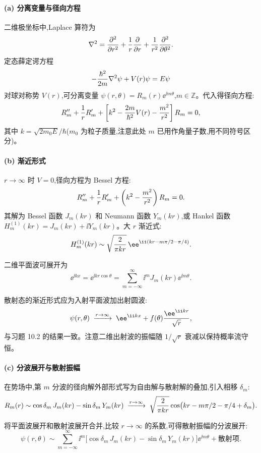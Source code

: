 \begin{solution}
\paragraph{(a) 分离变量与径向方程}

二维极坐标中,Laplace 算符为
\[
\nabla^2={\partial^2\over\partial r^2}+{1\over r}{\partial\over\partial r}+{1\over r^2}{\partial^2\over\partial\theta^2}.
\]
定态薛定谔方程
\[
-{\hbar^2\over2m}\nabla^2\psi+V(r)\psi=E\psi
\]
对球对称势 $V(r)$,可分离变量 $\psi(r,\theta)=R_m(r)\ee^{\ii m\theta}$,$m\in\mathbb Z$。代入得径向方程:
\[
R_m''+{1\over r}R_m'+\left[k^2-{2m\over\hbar^2}V(r)-{m^2\over r^2}\right]R_m=0,
\]
其中 $k=\sqrt{2m_0E}/\hbar$($m_0$ 为粒子质量,注意此处 $m$ 已用作角量子数,用不同符号区分)。

\paragraph{(b) 渐近形式}

$r\to\infty$ 时 $V=0$,径向方程为 Bessel 方程:
\[
R_m''+{1\over r}R_m'+\left(k^2-{m^2\over r^2}\right)R_m=0.
\]
其解为 Bessel 函数 $J_m(kr)$ 和 Neumann 函数 $Y_m(kr)$,或 Hankel 函数 $H_m^{(1)}(kr)=J_m(kr)+\ii Y_m(kr)$。大 $r$ 渐近式:
\[
H_m^{(1)}(kr)\sim\sqrt{2\over\pi kr}\,\ee^{\ii(kr-m\pi/2-\pi/4)}.
\]

二维平面波可展开为
\[
\ee^{\ii kx}=\ee^{\ii kr\cos\theta}=\sum_{m=-\infty}^{\infty}\ii^m J_m(kr)\ee^{\ii m\theta}.
\]

散射态的渐近形式应为入射平面波加出射圆波:
\[
\psi(r,\theta)\;\xrightarrow{r\to\infty}\; \ee^{\ii kx}+f(\theta){\ee^{\ii kr}\over\sqrt r},
\]
与习题 10.2 的结果一致。注意二维出射波的振幅随 $1/\sqrt{r}$ 衰减以保持概率流守恒。

\paragraph{(c) 分波展开与散射振幅}

在势场中,第 $m$ 分波的径向解外部形式写为自由解与散射解的叠加,引入相移 $\delta_m$:
\[
R_m(r)\sim\cos\delta_m\,J_m(kr)-\sin\delta_m\,Y_m(kr)
\;\xrightarrow{r\to\infty}\;
\sqrt{2\over\pi kr}\cos\bigl(kr-m\pi/2-\pi/4+\delta_m\bigr).
\]

将平面波展开和散射波展开合并,比较 $r\to\infty$ 的系数,可得散射振幅的分波展开:
\[
\psi(r,\theta)\sim\sum_{m=-\infty}^{\infty}\ii^m\bigl[\cos\delta_m\,J_m(kr)-\sin\delta_m\,Y_m(kr)\bigr]\ee^{\ii m\theta}
+\text{散射项}.
\]


\end{solution}
